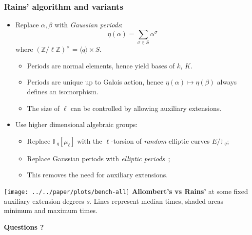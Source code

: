 \documentclass[francais]{beamer}
\def\Z {\ensuremath{\mathbb{Z}}}
\def\F {\ensuremath{\mathbb{F}}}
\begin{document}
\begin{frame}\frametitle{Rains' algorithm and variants}
    \begin{itemize}
    \item Replace $\alpha,\beta$ with \emph{Gaussian periods}:
      \[\eta(\alpha) = \sum_{\sigma\in S}\alpha^\sigma\]
      where $(\Z/\ell\Z)^\times = \langle q\rangle \times S$.
    \begin{itemize}
    \item Periods are normal elements, hence yield bases of $k$, $K$.
    \item Periods are unique up to Galois action, hence $\eta(\alpha)\mapsto\eta(\beta)$ always defines an isomorphism.
      \item The size of $\ell$ can be controlled by allowing auxiliary extensions.
    \end{itemize}
    \end{itemize}
    \begin{itemize}
    \item Use higher dimensional algebraic groups:
  \begin{itemize}
  \item Replace $\F_q[\mu_\ell]$ with the $\ell$-torsion of
    \emph{random} elliptic curves $E/\F_q$;
  \item Replace Gaussian periods with \emph{elliptic
      periods}~\cite{mihailescu+morain+schost07};
  \item This removes the need for auxiliary extensions.
  \end{itemize}
      \end{itemize}
\end{frame}

\begin{frame}
    \centering
    \texttt{[image: ../../paper/plots/bench-all]}
    \flushleft
      \textbf{Allombert's vs Rains'} at some fixed auxiliary extension
      degrees $s$. Lines represent median times, shaded areas minimum
      and maximum times.
\end{frame}

\begin{frame}
\Huge \textbf{Questions ?}
\end{frame}

\begin{frame}[allowframebreaks]\frametitle{\refname}
  \scriptsize
    
    
\end{frame}
\end{document}
